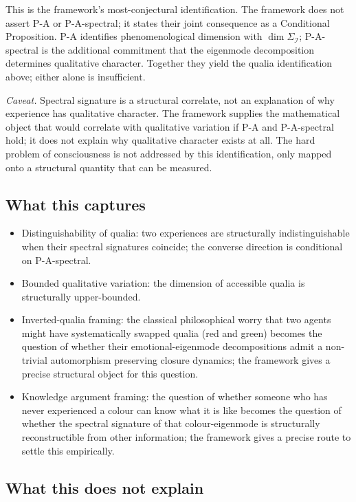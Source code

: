 \documentclass[11pt]{article}
\theoremstyle{plain}
\theoremstyle{definition}
\theoremstyle{remark}
\newcommand{\Ical}{\mathcal{I}}
\begin{document}
This is the framework's most-conjectural identification. The framework does not assert P-A or P-A-spectral; it states their joint consequence as a Conditional Proposition. P-A identifies phenomenological dimension with $\dim \Sigma_\Ical$; P-A-spectral is the additional commitment that the eigenmode decomposition determines qualitative character. Together they yield the qualia identification above; either alone is insufficient.

\noindent\emph{Caveat.} Spectral signature is a structural correlate, not an explanation of why experience has qualitative character. The framework supplies the mathematical object that would correlate with qualitative variation if P-A and P-A-spectral hold; it does not explain why qualitative character exists at all. The hard problem of consciousness is not addressed by this identification, only mapped onto a structural quantity that can be measured.

\subsection{What this captures}

\begin{itemize}[leftmargin=2em]
\item Distinguishability of qualia: two experiences are structurally indistinguishable when their spectral signatures coincide; the converse direction is conditional on P-A-spectral.
\item Bounded qualitative variation: the dimension of accessible qualia is structurally upper-bounded.
\item Inverted-qualia framing: the classical philosophical worry that two agents might have systematically swapped qualia (red and green) becomes the question of whether their emotional-eigenmode decompositions admit a non-trivial automorphism preserving closure dynamics; the framework gives a precise structural object for this question.
\item Knowledge argument framing: the question of whether someone who has never experienced a colour can know what it is like becomes the question of whether the spectral signature of that colour-eigenmode is structurally reconstructible from other information; the framework gives a precise route to settle this empirically.
\end{itemize}

\subsection{What this does not explain}
\end{document}
